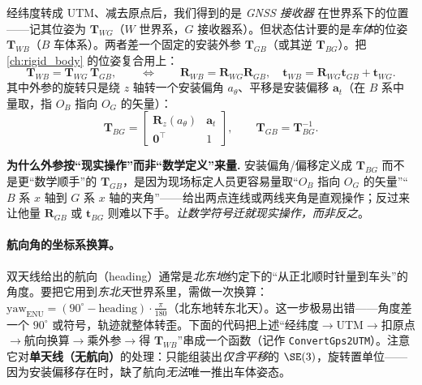经纬度转成 UTM、减去原点后，我们得到的是 \emph{GNSS 接收器} 在世界系下的位置——记其位姿为 $\mathbf{T}_{WG}$（$W$ 世界系，$G$ 接收器系）\cite{gao2023slamad}。但状态估计要的是\emph{车体}的位姿 $\mathbf{T}_{WB}$（$B$ 车体系）。两者差一个固定的安装外参 $\mathbf{T}_{GB}$（或其逆 $\mathbf{T}_{BG}$）。把 \cref{ch:rigid_body} 的位姿复合用上：
\begin{equation}
\label{eq:gins-twb}
\mathbf{T}_{WB} = \mathbf{T}_{WG}\,\mathbf{T}_{GB},
\qquad\Longleftrightarrow\qquad
\mathbf{R}_{WB}=\mathbf{R}_{WG}\mathbf{R}_{GB},\quad
\mathbf{t}_{WB}=\mathbf{R}_{WG}\mathbf{t}_{GB}+\mathbf{t}_{WG}.
\end{equation}
其中外参的旋转只是绕 $z$ 轴转一个安装偏角 $a_\theta$、平移是安装偏移 $\mathbf{a}_t$（在 $B$ 系中量取，指 $O_B$ 指向 $O_G$ 的矢量）\cite{gao2023slamad}：
\begin{equation}
\label{eq:gins-tbg}
\mathbf{T}_{BG} =
\begin{bmatrix}\mathbf{R}_z(a_\theta) & \mathbf{a}_t \\[2pt] \mathbf{0}^\top & 1\end{bmatrix},
\qquad \mathbf{T}_{GB}=\mathbf{T}_{BG}^{-1}.
\end{equation}

\begin{note}
\textbf{为什么外参按“现实操作”而非“数学定义”来量.}\;
安装偏角/偏移定义成 $\mathbf{T}_{BG}$ 而不是更“数学顺手”的 $\mathbf{T}_{GB}$，是因为现场标定人员更容易量取“$O_B$ 指向 $O_G$ 的矢量”“$B$ 系 $x$ 轴到 $G$ 系 $x$ 轴的夹角”——给出两点连线或两线夹角是直观操作；反过来让他量 $\mathbf{R}_{GB}$ 或 $\mathbf{t}_{BG}$ 则难以下手。\emph{让数学符号迁就现实操作，而非反之}\cite{gao2023slamad}。
\end{note}

\paragraph{航向角的坐标系换算。}
双天线给出的航向（heading）通常是\emph{北东地}约定下的“从正北顺时针量到车头”的角度。要把它用到\emph{东北天}世界系里，需做一次换算：$\text{yaw}_{\text{ENU}} = (90^\circ - \text{heading})\cdot\frac{\pi}{180}$（北东地转东北天）\cite{gao2023slamad}。这一步极易出错——角度差一个 $90^\circ$ 或符号，轨迹就整体转歪。下面的代码把上述“经纬度$\to$UTM$\to$扣原点$\to$航向换算$\to$乘外参$\to$得 $\mathbf{T}_{WB}$”串成一个函数（记作 \texttt{ConvertGps2UTM}）。注意它对\textbf{单天线（无航向）}的处理：只能组装出\emph{仅含平移}的 $\SE(3)$，旋转置单位——因为安装偏移存在时，缺了航向\emph{无法}唯一推出车体姿态。

